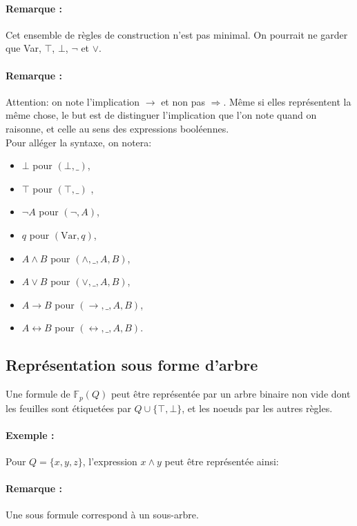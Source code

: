 \documentclass{scrartcl}
\newcommand{\rem}[1]{\paragraph{Remarque : } #1\\}
\newcommand{\exemple}[1]{\paragraph{Exemple : } #1\\}
\newcommand{\fpq}{\mathbb{F}_p(Q)}
\newcommand{\set}[1]{\{#1\}}
\newcommand{\corrpar}{\vspace{-20pt}}
\newcommand{\definition}[1]{{\parindent0pt #1}}
\begin{document}
				\rem{Cet ensemble de règles de construction n'est pas minimal. On pourrait ne garder que Var, $\top$, $\bot$, $\neg$ et $\vee$.}
				\corrpar
				\rem{Attention: on note l'implication $\rightarrow$ et non pas $\Rightarrow$. Même si elles représentent la même chose, le but est de distinguer l'implication que l'on note quand on raisonne, et celle au sens des expressions booléennes.}

				\definition{Pour alléger la syntaxe, on notera:}

				\begin{multicols}{2}
				\begin{itemize}
					\item $\bot$ pour $(\bot,\_)$,
					\item $\top$ pour $(\top,\_)$ ,
					\item $\neg A$ pour $(\neg,A)$,
					\item $q$ pour $(\text{Var},q)$, 
					\item $A \wedge B$ pour $(\wedge,\_,A,B)$,
					\item $A \vee B$ pour $(\vee,\_,A,B)$,
					\item $A \rightarrow B$ pour $(\rightarrow,\_,A,B)$,
					\item $A \leftrightarrow B$ pour $(\leftrightarrow,\_,A,B)$.
				\end{itemize}
				\end{multicols}

		\subsection{Représentation sous forme d'arbre}
			Une formule de $\fpq$ peut être représentée par un arbre binaire non vide dont les feuilles sont étiquetées par $Q\cup\set{\top,\bot}$,
			et les noeuds par les autres règles.

			\exemple{Pour $Q = \{x,y,z\}$, l'expression $ x\wedge y$ peut être représentée ainsi:}
			\begin{center}\end{center}

			\rem{Une sous formule correspond à un sous-arbre.}
\end{document}
